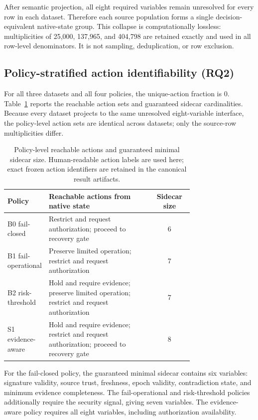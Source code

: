 \documentclass[preprint,12pt]{elsarticle}
\begin{document}
After semantic projection, all eight required variables remain unresolved for every row in each dataset. Therefore each source population forms a single decision-equivalent native-state group. This collapse is computationally lossless: multiplicities of 25,000, 137,965, and 404,798 are retained exactly and used in all row-level denominators. It is not sampling, deduplication, or row exclusion.

\subsection{Policy-stratified action identifiability (RQ2)}

For all three datasets and all four policies, the unique-action fraction is 0. Table~\ref{tab:policies} reports the reachable action sets and guaranteed sidecar cardinalities. Because every dataset projects to the same unresolved eight-variable interface, the policy-level action sets are identical across datasets; only the source-row multiplicities differ.

\begin{table}[htbp]
\centering
\small
\caption{Policy-level reachable actions and guaranteed minimal sidecar size. Human-readable action labels are used here; exact frozen action identifiers are retained in the canonical result artifacts.}
\label{tab:policies}
\begin{tabular}{>{\raggedright\arraybackslash}p{0.18\linewidth}>{\raggedright\arraybackslash}p{0.56\linewidth}c}
\toprule
Policy & Reachable actions from native state & Sidecar size \\
\midrule
B0 fail-closed &
Restrict and request authorization; proceed to recovery gate & 6 \\
B1 fail-operational &
Preserve limited operation; restrict and request authorization & 7 \\
B2 risk-threshold &
Hold and require evidence; preserve limited operation; restrict and request authorization & 7 \\
S1 evidence-aware &
Hold and require evidence; restrict and request authorization; proceed to recovery gate & 8 \\
\bottomrule
\end{tabular}
\end{table}

For the fail-closed policy, the guaranteed minimal sidecar contains six variables: signature validity, source trust, freshness, epoch validity, contradiction state, and minimum evidence completeness. The fail-operational and risk-threshold policies additionally require the security signal, giving seven variables. The evidence-aware policy requires all eight variables, including authorization availability.
\end{document}
